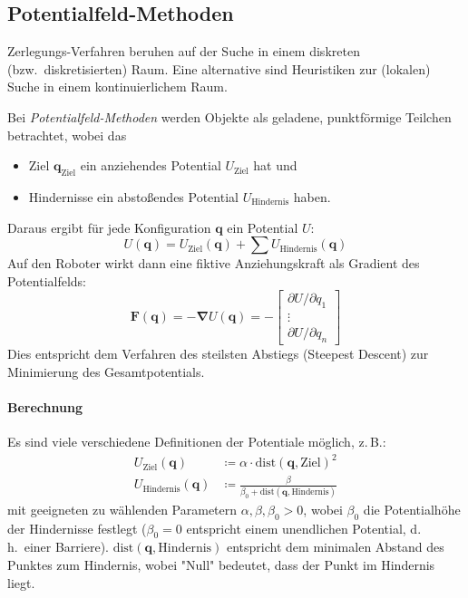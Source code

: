 \documentclass[a4paper, 11pt, accentcolor = tud3b]{tudreport}
\renewcommand{\vec}[1]{\boldsymbol{#1}}
\renewcommand{\dh}{d.\,h.~}
\newcommand{\bzw}{bzw.~}
\begin{document}
			\subsection{Potentialfeld-Methoden} %
				Zerlegungs-Verfahren beruhen auf der Suche in einem diskreten (\bzw diskretisierten) Raum. Eine alternative sind Heuristiken zur (lokalen) Suche in einem kontinuierlichem Raum.
				
				Bei \emph{Potentialfeld-Methoden} werden Objekte als geladene, punktförmige Teilchen betrachtet, wobei das
				\begin{itemize}
					\item Ziel \( \vec{q}_\text{Ziel} \) ein anziehendes Potential \( U_\text{Ziel} \) hat und
					\item Hindernisse ein abstoßendes Potential \( U_\text{Hindernis} \) haben.
				\end{itemize}
				Daraus ergibt für jede Konfiguration \( \vec{q} \) ein Potential \(U\):
				\begin{equation*}
					U(\vec{q}) = U_\text{Ziel}(\vec{q}) + \sum U_\text{Hindernis}(\vec{q})
				\end{equation*}
				Auf den Roboter wirkt dann eine fiktive Anziehungskraft als Gradient des Potentialfelds:
				\begin{equation*}
					\vec{F}(\vec{q}) = -\vec{\nabla} U(\vec{q}) =
						- \begin{bmatrix}
							\partial U / \partial q_1 \\
							\vdots \\
							\partial U / \partial q_n
						\end{bmatrix}
				\end{equation*}
				Dies entspricht dem Verfahren des steilsten Abstiegs (Steepest Descent) zur Minimierung des Gesamtpotentials.
				
				\paragraph{Berechnung}
					Es sind viele verschiedene Definitionen der Potentiale möglich, z.\,B.:
					\begin{align*}
						U_\text{Ziel}(\vec{q}) &\coloneqq \alpha \cdot \text{dist}(\vec{q}, \text{Ziel})^2 \\
						U_\text{Hindernis}(\vec{q}) &\coloneqq \frac{\beta}{\beta_0 + \text{dist}(\vec{q}, \text{Hindernis})}
					\end{align*}
					mit geeigneten zu wählenden Parametern \( \alpha, \beta, \beta_0 > 0 \), wobei \( \beta_0 \) die Potentialhöhe der Hindernisse festlegt (\( \beta_0 = 0 \) entspricht einem unendlichen Potential, \dh einer Barriere). \( \text{dist}(\vec{q}, \text{Hindernis}) \) entspricht dem minimalen Abstand des Punktes zum Hindernis, wobei "Null" bedeutet, dass der Punkt im Hindernis liegt.
					
\end{document}

